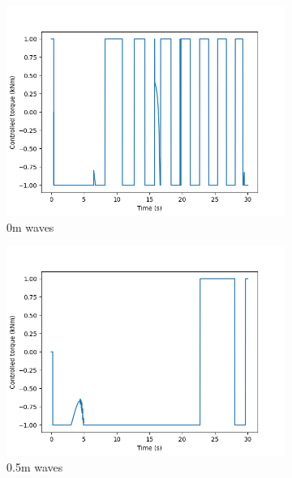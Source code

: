 \documentclass[class=article, crop=false]{standalone}
\begin{document}
\begin{figure}
    \centering
    \begin{subfigure}{0.65\textwidth}
        \centering
        \includegraphics{scenario1/rov-50m/0.0m/usv_torque}
        \caption{0m waves}
    \end{subfigure}
    \vfill
    \begin{subfigure}{0.65\textwidth}
        \centering
        \includegraphics{scenario1/rov-50m/0.5m/usv_torque}
        \caption{0.5m waves}
    \end{subfigure}
    \vfill
    \begin{subfigure}{0.65\textwidth}
        \centering

\end{subfigure}
\end{figure}
\end{document}
